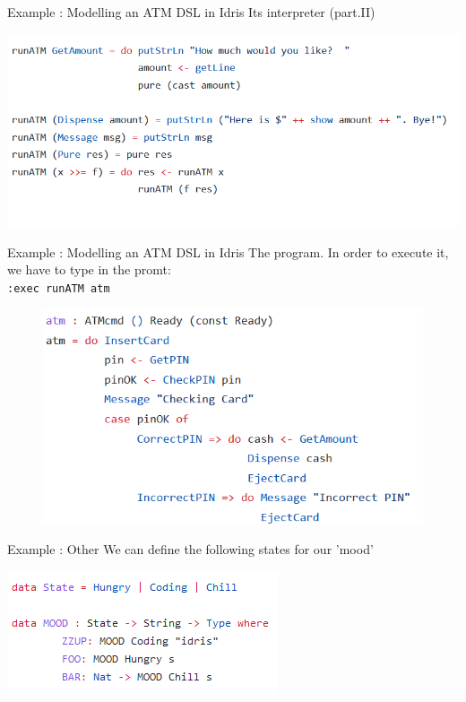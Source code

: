 \documentclass{beamer}
\newcommand{\dsltitle}{Example : Modelling an ATM DSL in Idris}
\newcommand{\othertitle}{Example : Other}
\begin{document}
	\begin{frame}[fragile]{\dsltitle}
		Its interpreter (part.II)
		\begin{center}
			\includegraphics[width=\textwidth]{pics/dsl-code-4_2}
		\end{center}
	\end{frame}
	
	\begin{frame}[fragile]{\dsltitle}
		The program. In order to execute it, we have to type in the promt:\\
		\texttt{:exec runATM atm}
		\begin{figure}
			\raggedright
			\includegraphics[scale=0.5]{pics/dsl-code-5}
		\end{figure}
	\end{frame}
	
	\begin{frame}[fragile]{\othertitle}
		We can define the following states for our 'mood'
		\begin{center}
			\includegraphics[scale=0.8]{pics/random-code-1}
		\end{center}
	\end{frame}
	
\end{document}

